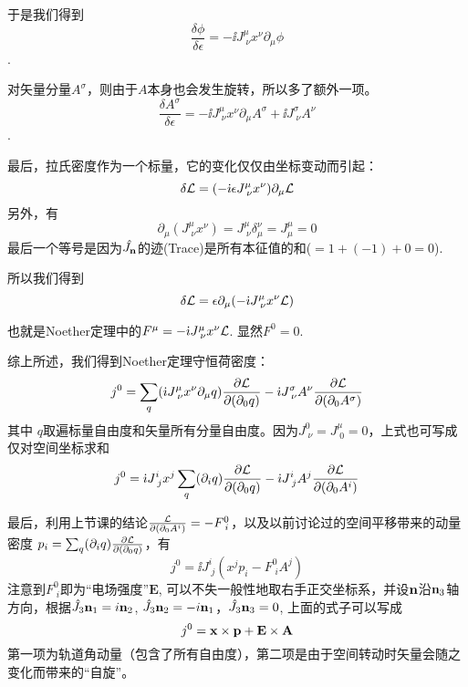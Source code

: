 \documentclass[CJK]{beamer}
\begin{document}
\begin{frame}
\bch
于是我们得到
$$\frac{\delta \phi}{\delta\epsilon} = -\ii  J^\mu_{\;\nu} x^\nu \partial_\mu \phi$$.

\skipline
对矢量分量$A^\sigma$，则由于$A$本身也会发生旋转，所以多了额外一项。
$$\frac{\delta A^\sigma}{\delta\epsilon} = -\ii  J^\mu_{\;\nu} x^\nu\partial_\mu A^\sigma + \ii J^\sigma_{\;\nu}A^\nu$$.

\ech
\end{frame}

\begin{frame}
\bch
最后，拉氏密度作为一个标量，它的变化仅仅由坐标变动而引起：
$$ \delta {\mathcal{L}} = (-{\dot{\imath}} \epsilon J^\mu_{\;\nu} x^\nu)\partial_\mu {\mathcal{L}} $$
另外，有
$$\partial_\mu(J^\mu_{\;\nu} x^\nu) = J^\mu_{\;\nu} \delta^\nu_\mu = J^\mu_\mu = 0 $$
最后一个等号是因为${\hat{J_{\mathbf{n}}}}$的迹(Trace)是所有本征值的和($=1+(-1)+0 = 0$).

所以我们得到
$$\delta {\mathcal{L}} = \epsilon \partial_\mu (-{\dot{\imath}}  J^\mu_{\;\nu} x^\nu {\mathcal{L}}) $$

也就是Noether定理中的$F^\mu = -{\dot{\imath}}  J^\mu_{\;\nu} x^\nu {\mathcal{L}}$. 显然$F^0 = 0$.
\ech
\end{frame}

\begin{frame}
\bch
综上所述，我们得到Noether定理守恒荷密度：
$$j^0 =   \sum_q({\dot{\imath}}  J^\mu_{\;\nu} x^\nu \partial_\mu q) \frac{\partial {\mathcal{L}}}{\partial(\partial_0 q)} - {\dot{\imath}} J^\sigma_{\;\nu}A^\nu \frac{\partial {\mathcal{L}}}{\partial(\partial_0 A^\sigma)}$$
其中 $q$取遍标量自由度和矢量所有分量自由度。因为$J^0_{\;\nu} = J^\mu_{\;0} = 0$，上式也可写成仅对空间坐标求和
$$j^0 =  {\dot{\imath}}  J^i_{\;j} x^j \sum_q(\partial_i q )\frac{\partial {\mathcal{L}}}{\partial(\partial_0 q)} - {\dot{\imath}} J^i_{\;j}A^j \frac{\partial {\mathcal{L}}}{\partial(\partial_0 A^i)}$$
\ech
\end{frame}

\begin{frame}
\bch
最后，利用上节课的结论$\frac{{\mathcal{L}}}{\partial(\partial_0 A^i)} = - F^0_{\; i}$，以及以前讨论过的空间平移带来的动量密度
$p_i = \sum_q(\partial_i q )\frac{\partial {\mathcal{L}}}{\partial(\partial_0 q)} $，有
$$j^0 =  \ii  J^i_{\;j} (x^j p_i - F^0_{\;i} A^j)$$
注意到$F^0_{\;i}$即为“电场强度”$\mathbf{E}$, 可以不失一般性地取右手正交坐标系，并设${\mathbf{n}}$沿${\mathbf{n}}_3$轴方向，根据$\hat{J_{ 3 }}{\mathbf{n}}_1 = i {\mathbf{n}}_2$, $\hat{J_{ 3 }}{\mathbf{n}}_2 = - i{\mathbf{n}}_1$，$\hat{J_{ 3 }}{\mathbf{n}}_3 = 0$, 上面的式子可以写成
$$j^0 = {\mathbf{x}} \times {\mathbf{p}} + \mathbf{E} \times \mathbf{A}$$
第一项为轨道角动量（包含了所有自由度），第二项是由于空间转动时矢量会随之变化而带来的“自旋”。
\ech
\end{frame}
\end{document}
